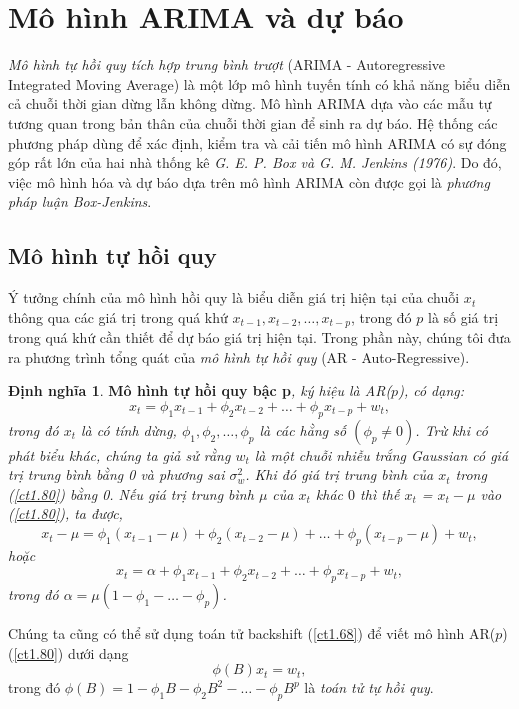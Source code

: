 \documentclass[12pt, a4paper,oneside]{book}
\theoremstyle{definition}
\newtheorem{dn}[theo]{Định nghĩa}
\begin{document}
\section{Mô hình ARIMA và dự báo}
\textit{Mô hình tự hồi quy tích hợp trung bình trượt} (ARIMA - Autoregressive Integrated Moving Average) là một lớp mô hình tuyến tính có khả năng biểu diễn cả chuỗi thời gian dừng lẫn không dừng. Mô hình ARIMA dựa vào các mẫu tự tương quan trong bản thân của chuỗi thời gian để sinh ra dự báo. Hệ thống các phương pháp dùng để xác định, kiểm tra và cải tiến mô hình ARIMA có sự đóng góp rất lớn của hai nhà thống kê \textit{G. E. P. Box và G. M. Jenkins (1976)}. Do đó, việc mô hình hóa và dự báo dựa trên mô hình ARIMA còn được gọi là \textit{phương pháp luận Box-Jenkins}. 
\subsection{Mô hình tự hồi quy}

Ý tưởng chính của mô hình hồi quy là biểu diễn giá trị hiện tại của chuỗi $x_{t}$ thông qua các giá trị trong quá khứ $x_{t-1}, x_{t-2}, \dots, x_{t-p}$, trong đó $p$ là số giá trị trong quá khứ cần thiết để dự báo giá trị hiện tại. Trong phần này, chúng tôi đưa ra phương trình tổng quát của \textit{mô hình tự hồi quy} (AR - Auto-Regressive).
\begin{dn}\cite{8, 9}
	\textbf{Mô hình tự hồi quy bậc p}\textit{, ký hiệu là AR($p$), có dạng:
		\begin{equation}
		x_{t} = \phi_{1}x_{t-1} + \phi_{2}x_{t-2} + \dots+ \phi_{p}x_{t-p}+ w_{t}, \label{ct1.80}
		\end{equation}	
		trong đó $x_{t}$ là có tính dừng, $\phi_{1}, \phi_{2}, \dots, \phi_{p}$ là các hằng số $(\phi_{p} \neq 0)$. Trừ khi có phát biểu khác, chúng ta giả sử rằng $w_{t}$ là một chuỗi nhiễu trắng Gaussian có giá trị trung bình bằng 0 và phương sai $\sigma^{2}_w$. Khi đó giá trị trung bình của $x_t$ trong (\ref{ct1.80}) bằng 0. Nếu giá trị trung bình $\mu$ của $x_{t}$ khác $0$ thì thế $x_{t}$ = $x_{t} − \mu$ vào (\ref{ct1.80}), ta được,
		\begin{equation}
		x_{t} − \mu= \phi_{1}(x_{t-1} - \mu) + \phi_{2}(x_{t-2}-\mu) +\dots+\phi_{p}(x_{t-p}- \mu) +w_{t}, \label{ct1.81}
		\end{equation}
		hoặc
		\begin{equation}
		x_{t}= \alpha + \phi_{1}x_{t-1} + \phi_{2}x_{t-2}+\dots+ \phi_{p}x_{t-p}+ w_{t}, \label{ct1.82}
		\end{equation}
		trong đó $\alpha = \mu(1-\phi_{1}-\dots-\phi_{p})$.}
\end{dn}
Chúng ta cũng có thể sử dụng toán tử backshift (\ref{ct1.68}) để viết mô hình AR($p$) (\ref{ct1.80}) dưới dạng
\begin{equation}
\phi(B)x_{t}= w_{t}, \label{ct1.84}	
\end{equation}
trong đó $\phi(B)=1-\phi_{1}B - \phi_{2}B^{2}- \dots- \phi_{p}B^{p}$ là \textit{toán tử tự hồi quy}.
\end{document}

